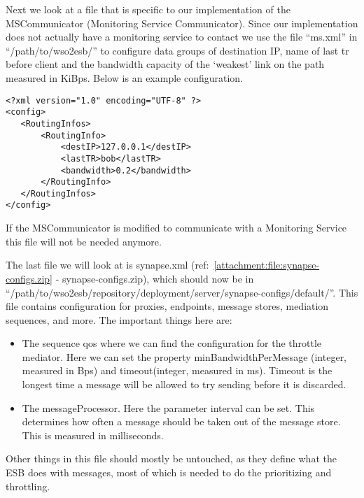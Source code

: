 	Next we look at a file that is specific to our implementation of the MSCommunicator (Monitoring Service Communicator). Since our implementation does not actually have a monitoring service to contact we use the file “ms.xml” in “/path/to/wso2esb/” to configure data groups of destination IP, name of last \gls{tr} before client and the bandwidth capacity of the ‘weakest’ link on the path measured in KiBps. Below is an example configuration.\\

\lstset{language=XML, style=eclipse}
\lstset{showstringspaces=false}
\begin{lstlisting}[frame=single, caption={ppd.xml}, label=ppd listing, breaklines=true] %It is ok that this is not referenced in text =)
<?xml version="1.0" encoding="UTF-8" ?>
<config>
   <RoutingInfos>
	   <RoutingInfo>
	       <destIP>127.0.0.1</destIP>
	       <lastTR>bob</lastTR>
	       <bandwidth>0.2</bandwidth>
	   </RoutingInfo>
   </RoutingInfos>
</config>
\end{lstlisting}

	If the MSCommunicator is modified to communicate with a Monitoring Service this file will not be needed anymore.

	The last file we will look at is synapse.xml (ref:~\ref{attachment:file:synapse-configs.zip} - synapse-configs.zip), which should now be in “/path/to/wso2esb/repository/deployment/server/synapse-configs/default/”. This file contains configuration for proxies, endpoints, message stores, mediation sequences, and more. The important things here are:
	\begin{itemize}
	\item The sequence qos where we can find the configuration for the throttle mediator. Here we can set the property minBandwidthPerMessage (integer, measured in Bps) and timeout(integer, measured in ms). Timeout is the longest time a message will be allowed to try sending before it is discarded.
	\item The messageProcessor. Here the parameter interval can be set. This determines how often a message should be taken out of the message store. This is measured in milliseconds.
	\end{itemize}
	Other things in this file should mostly be untouched, as they define what the ESB does with messages, most of which is needed to do the prioritizing and throttling.
